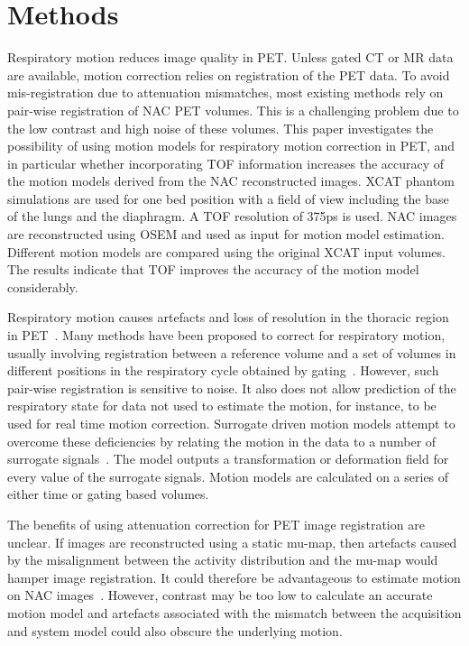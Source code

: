 \chapter{Methods} \label{methods}
    \blindtext
    
        Respiratory motion reduces image quality in \gls{PET}. Unless gated \gls{CT} or \gls{MR} data are available, motion correction relies on registration of the \gls{PET} data. To avoid mis-registration due to attenuation mismatches, most existing methods rely on pair-wise registration of \gls{NAC} \gls{PET} volumes. This is a challenging problem due to the low contrast and high noise of these volumes. This paper investigates the possibility of using motion models for respiratory motion correction in \gls{PET}, and in particular whether incorporating \gls{TOF} information increases the accuracy of the motion models derived from the \gls{NAC} reconstructed images. \gls{XCAT} phantom simulations are used for one bed position with a field of view including the base of the lungs and the diaphragm. A \gls{TOF} resolution of 375ps is used. \gls{NAC} images are reconstructed using \gls{OSEM} and used as input for motion model estimation. Different motion models are compared using the original \gls{XCAT} input volumes. The results indicate that \gls{TOF} improves the accuracy of the motion model considerably.
        
        Respiratory motion causes artefacts and loss of resolution in the thoracic region in \gls{PET}~\cite{Nehmeh2008}. Many methods have been proposed to correct for respiratory motion, usually involving registration between a reference volume and a set of volumes in different positions in the respiratory cycle obtained by gating~\cite{Oliveira2014}. However, such pair-wise registration is sensitive to noise. It also does not allow prediction of the respiratory state for data not used to estimate the motion, for instance, to be used for real time motion correction. Surrogate driven motion models attempt to overcome these deficiencies by relating the motion in the data to a number of surrogate signals~\cite{McClelland2013}. The model outputs a transformation or deformation field for every value of the surrogate signals. Motion models are calculated on a series of either time or gating based volumes.

        The benefits of using attenuation correction for \gls{PET} image registration are unclear. If images are reconstructed using a static \gls{mu-map}, then artefacts caused by the misalignment between the activity distribution and the \gls{mu-map} would hamper image registration. It could therefore be advantageous to estimate motion on \gls{NAC} images~\cite{WenjiaBai2011}. However, contrast may be too low to calculate an accurate motion model and artefacts associated with the mismatch between the acquisition and system model could also obscure the underlying motion. 
        
